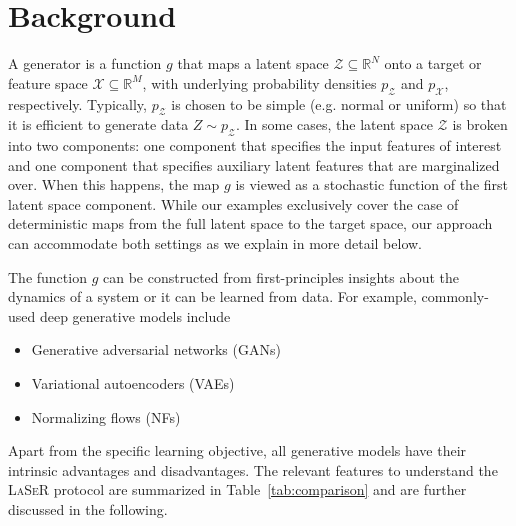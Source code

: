 \section{Background}
\label{sec:background}
A generator is a function $g$ that maps a latent space $\mathcal{Z}\subseteq \mathbb{R}^N$ onto a target or feature space $\mathcal{X}\subseteq \mathbb{R}^M$, with underlying probability densities $p_\mathcal{Z}$ and $p_\mathcal{X}$, respectively.  Typically, $p_\mathcal{Z}$ is chosen to be simple (e.g. normal or uniform) so that it is efficient to generate data $Z\sim p_\mathcal{Z}$.  In some cases, the latent space $\mathcal{Z}$ is broken into two components: one component that specifies the input features of interest and one component that specifies auxiliary latent features that are marginalized over.  When this happens, the map $g$ is viewed as a stochastic function of the first latent space component.  While our examples exclusively cover the case of deterministic maps from the full latent space to the target space, our approach can accommodate both settings as we explain in more detail below.

The function $g$ can be constructed from first-principles insights about the dynamics of a system or it can be learned from data.  For example, commonly-used deep generative models include

\begin{itemize}
    \item Generative adversarial networks (GANs)~\cite{goodfellow,Creswell2018}
    \item Variational autoencoders (VAEs)~\cite{kingma2014autoencoding,Kingma2019}
    \item Normalizing flows (NFs)~\cite{nflow1,nflow_review} %
\end{itemize}

Apart from the specific learning objective, all generative models have their intrinsic advantages and disadvantages. The relevant features to understand the \textsc{LaSeR} protocol are summarized in Table~\ref{tab:comparison} and are further discussed in the following.

